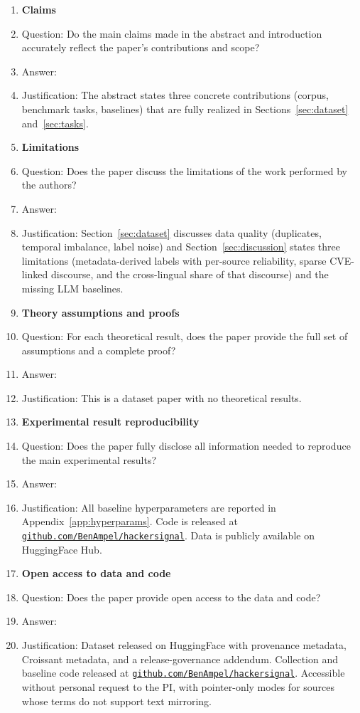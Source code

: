 \documentclass{article}
\begin{document}
\begin{enumerate}

\item {\bf Claims}
    \item[] Question: Do the main claims made in the abstract and introduction accurately reflect the paper's contributions and scope?
    \item[] Answer: \answerYes{}
    \item[] Justification: The abstract states three concrete contributions (corpus, benchmark tasks, baselines) that are fully realized in Sections~\ref{sec:dataset} and~\ref{sec:tasks}.

\item {\bf Limitations}
    \item[] Question: Does the paper discuss the limitations of the work performed by the authors?
    \item[] Answer: \answerYes{}
\item[] Justification: Section~\ref{sec:dataset} discusses data quality (duplicates, temporal imbalance, label noise) and Section~\ref{sec:discussion} states three limitations (metadata-derived labels with per-source reliability, sparse CVE-linked discourse, and the cross-lingual share of that discourse) and the missing LLM baselines.

\item {\bf Theory assumptions and proofs}
    \item[] Question: For each theoretical result, does the paper provide the full set of assumptions and a complete proof?
    \item[] Answer: \answerNA{}
    \item[] Justification: This is a dataset paper with no theoretical results.

\item {\bf Experimental result reproducibility}
    \item[] Question: Does the paper fully disclose all information needed to reproduce the main experimental results?
    \item[] Answer: \answerYes{}
    \item[] Justification: All baseline hyperparameters are reported in Appendix~\ref{app:hyperparams}. Code is released at \href{https://github.com/BenAmpel/hackersignal}{\texttt{github.com/BenAmpel/hackersignal}}. Data is publicly available on HuggingFace Hub.

\item {\bf Open access to data and code}
    \item[] Question: Does the paper provide open access to the data and code?
    \item[] Answer: \answerYes{}
    \item[] Justification: Dataset released on HuggingFace with provenance metadata, Croissant metadata, and a release-governance addendum. Collection and baseline code released at \href{https://github.com/BenAmpel/hackersignal}{\texttt{github.com/BenAmpel/hackersignal}}. Accessible without personal request to the PI, with pointer-only modes for sources whose terms do not support text mirroring.


\end{enumerate}
\end{document}
